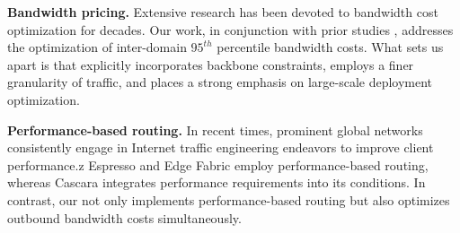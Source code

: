\noindent \textbf{Bandwidth pricing.}
Extensive research \cite{singh2021costCascara,jalaparti2016dynamicPretium,goldenberg2004optimizing,zhang2010optimizingEntact,chen2022onlineOnTPC} has been devoted to bandwidth cost optimization for decades. Our work, in conjunction with prior studies \cite{chen2022onlineOnTPC, singh2021costCascara, goldenberg2004optimizing}, addresses the optimization of inter-domain $95^{th}$ percentile bandwidth costs. What sets us apart is that {\sys} explicitly incorporates backbone constraints, employs a finer granularity of traffic, and places a strong emphasis on large-scale deployment optimization.




\noindent \textbf{Performance-based routing.}
In recent times, prominent global networks \cite{yap2017espresso, schlinker2017edgefabric, singh2021costCascara} consistently engage in Internet traffic engineering endeavors to improve client performance.z           Espresso \cite{yap2017espresso} and Edge Fabric \cite{schlinker2017edgefabric} employ performance-based routing, whereas Cascara \cite{singh2021costCascara} integrates performance requirements into its conditions. In contrast, our {\sys} not only implements performance-based routing but also optimizes outbound bandwidth costs simultaneously. 



